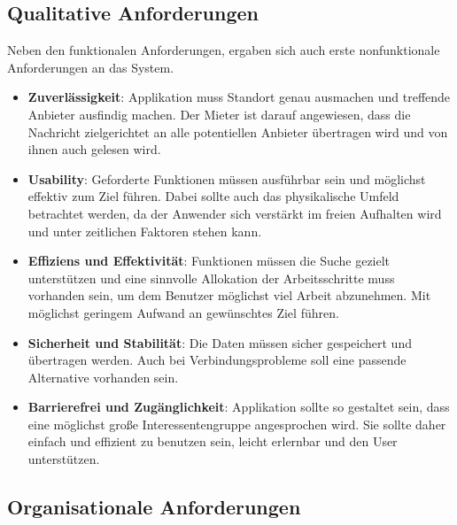 \newpage 

\subsection{Qualitative Anforderungen} 
Neben den funktionalen Anforderungen, ergaben sich auch erste nonfunktionale Anforderungen an das System.

\begin{itemize}
   \item 
   \textbf{Zuverlässigkeit}: Applikation muss Standort genau ausmachen und treffende Anbieter ausfindig machen. Der Mieter ist darauf angewiesen, dass die Nachricht zielgerichtet an alle  
   potentiellen Anbieter übertragen wird und von ihnen auch gelesen wird.
   
   \item
   \textbf{Usability}: Geforderte Funktionen müssen ausführbar sein und möglichst effektiv zum Ziel führen. Dabei sollte auch das physikalische Umfeld betrachtet werden, da der Anwender sich verstärkt im freien Aufhalten wird und unter zeitlichen Faktoren stehen kann.
   
   \item 
   \textbf{Effiziens und Effektivität}: Funktionen müssen die Suche gezielt unterstützen und eine sinnvolle Allokation der Arbeitsschritte muss vorhanden sein, um dem Benutzer möglichst viel Arbeit abzunehmen. Mit möglichst geringem Aufwand an gewünschtes Ziel führen.   
   
   \item
   \textbf{Sicherheit und Stabilität}: Die Daten müssen sicher gespeichert und übertragen werden. Auch bei Verbindungsprobleme soll eine passende Alternative vorhanden sein.

   \item
   \textbf{Barrierefrei und Zugänglichkeit}: Applikation sollte so gestaltet sein, dass eine möglichst große Interessentengruppe angesprochen wird. Sie sollte daher einfach und effizient zu benutzen sein, leicht erlernbar und den User unterstützen.
 

\end{itemize}

\subsection{Organisationale Anforderungen}          



